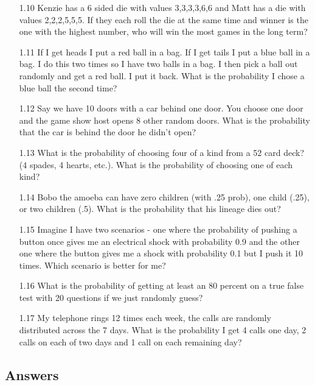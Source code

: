 \begin{enumerate}
\item[1.10]
Kenzie has a 6 sided die with values 3,3,3,3,6,6 and Matt has a die with values 2,2,2,5,5,5. If they each roll the die at the same time and winner is the one with the highest number, who will win the most games in the long term?

\item[1.11]
If I get heads I put a red ball in a bag. If I get tails I put a blue ball in a bag. I do this two times so I have two balls in a bag. I then pick a ball out randomly and get a red ball. I put it back. What is the probability I chose a blue ball the second time?

\item[1.12]
Say we have 10 doors with a car behind one door. You choose one door and the game show host opens 8 other random doors. What is the probability that the car is behind the door he didn't open?

\item[1.13]
What is the probability of choosing four of a kind from a 52 card deck? (4 spades, 4 hearts, etc.). What is the probability of choosing one of each kind?

\item[1.14]
Bobo the amoeba can have zero children (with .25 prob), one child (.25), or two children (.5). What is the probability that his lineage dies out?

\item[1.15]
Imagine I have two scenarios - one where the probability of pushing a button once gives me an electrical shock with probability 0.9 and the other one where the button gives me a shock with probability 0.1 but I push it 10 times. Which scenario is better for me?

\item[1.16]
What is the probability of getting at least an 80 percent on a true false test with 20 questions if we just randomly guess?

\item[1.17]
My telephone rings 12 times each week, the calls are randomly distributed across the 7 days. What is the probability I get 4 calls one day, 2 calls on each of two days and 1 call on each remaining day?

\end{enumerate}

\subsection{Answers}

